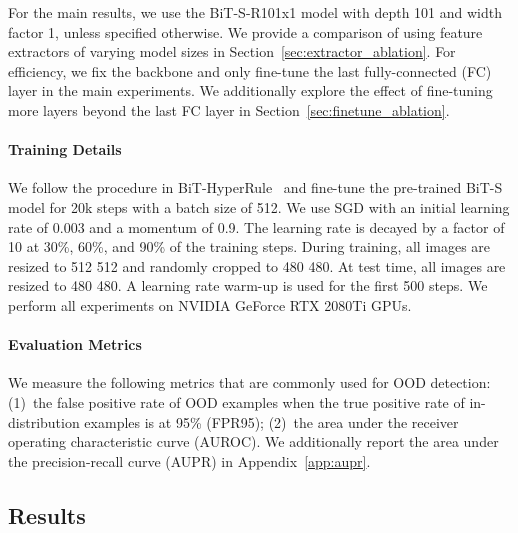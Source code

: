 \documentclass[final]{cvpr}
\begin{document}
For the main results, we use the BiT-S-R101x1 model with depth 101 and width factor 1, unless specified otherwise. We provide a comparison of using  feature extractors of varying model sizes in Section~\ref{sec:extractor_ablation}. For efficiency, we fix the backbone and only fine-tune the last fully-connected (FC) layer in the main experiments. We additionally explore the effect of fine-tuning more layers beyond the last FC layer in Section~\ref{sec:finetune_ablation}.

\vspace{-0.5cm}
\paragraph{Training Details} We follow the procedure in BiT-HyperRule~\cite{kolesnikov2020big} and fine-tune the pre-trained BiT-S model for 20k steps with a batch size of 512. We use SGD with an initial learning rate of 0.003 and a momentum of 0.9. The learning rate is decayed by a factor of 10 at 30\%, 60\%, and 90\% of the training steps. During training, all images are resized to 512  512 and randomly cropped to 480  480. At test time, all images are resized to 480  480. A learning rate warm-up is used for the first 500 steps. We perform all experiments on NVIDIA GeForce RTX 2080Ti GPUs.

\vspace{-0.5cm}
\paragraph{Evaluation Metrics} We measure the following metrics that are commonly used for OOD detection: (1)~the false positive rate of OOD examples when the true positive rate of in-distribution examples is at 95\% (FPR95); (2)~the area under the receiver operating characteristic curve (AUROC). We additionally report the area under the precision-recall curve (AUPR) in Appendix~\ref{app:aupr}.

\vspace{-0.1cm}
\subsection{Results}
\label{sec:exp_results}
\end{document}
